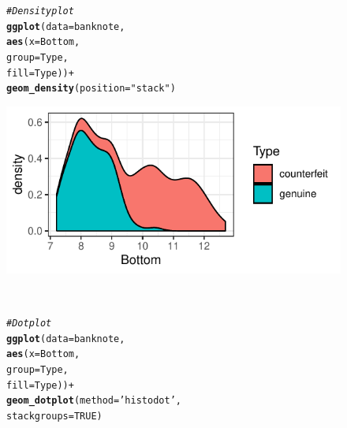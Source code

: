 \documentclass[letterpaper]{ar-1col}\usepackage[]{graphicx}\usepackage[]{color}
\makeatletter
\newcommand{\hlnum}[1]{\textcolor[rgb]{0.686,0.059,0.569}{#1}}%
\newcommand{\hlstr}[1]{\textcolor[rgb]{0.192,0.494,0.8}{#1}}%
\newcommand{\hlcom}[1]{\textcolor[rgb]{0.678,0.584,0.686}{\textit{#1}}}%
\newcommand{\hlopt}[1]{\textcolor[rgb]{0,0,0}{#1}}%
\newcommand{\hlstd}[1]{\textcolor[rgb]{0.345,0.345,0.345}{#1}}%
\newcommand{\hlkwc}[1]{\textcolor[rgb]{0.333,0.667,0.333}{#1}}%
\newcommand{\hlkwd}[1]{\textcolor[rgb]{0.737,0.353,0.396}{\textbf{#1}}}%
\newenvironment{kframe}{%
 \def\at@end@of@kframe{}%
 \ifinner\ifhmode%
  \def\at@end@of@kframe{\end{minipage}}%
  \begin{minipage}{\columnwidth}%
 \fi\fi%
 \def\FrameCommand##1{\hskip\@totalleftmargin \hskip-\fboxsep
 \colorbox{shadecolor}{##1}\hskip-\fboxsep
     \hskip-\linewidth \hskip-\@totalleftmargin \hskip\columnwidth}%
 \MakeFramed {\advance\hsize-\width
   \@totalleftmargin\z@ \linewidth\hsize
   \@setminipage}}%
 {\par\unskip\endMakeFramed%
 \at@end@of@kframe}
\newenvironment{knitrout}{}{} %
\makeatother
\begin{document}
\begin{figure}
\begin{minipage}{.495\textwidth}
\begin{knitrout}
\color{fgcolor}\begin{kframe}
\begin{alltt}
\hlcom{# Density plot}
\hlkwd{ggplot}\hlstd{(}\hlkwc{data} \hlstd{= banknote,}
       \hlkwd{aes}\hlstd{(}\hlkwc{x} \hlstd{= Bottom,}
           \hlkwc{group} \hlstd{= Type,}
           \hlkwc{fill} \hlstd{= Type))} \hlopt{+}
  \hlkwd{geom_density}\hlstd{(}\hlkwc{position} \hlstd{=} \hlstr{"stack"}\hlstd{)}
\end{alltt}
\end{kframe}
\end{knitrout}
\end{minipage}\hfill
\begin{minipage}{.45\textwidth}
\includegraphics[width=.99\textwidth]{figure/gg-plots-figs-1}
\end{minipage}\\
\begin{minipage}{.495\textwidth}
\begin{knitrout}
\color{fgcolor}\begin{kframe}
\begin{alltt}
\hlcom{# Dotplot}
\hlkwd{ggplot}\hlstd{(}\hlkwc{data} \hlstd{= banknote,}
       \hlkwd{aes}\hlstd{(}\hlkwc{x} \hlstd{= Bottom,}
           \hlkwc{group} \hlstd{= Type,}
           \hlkwc{fill} \hlstd{= Type))} \hlopt{+}
  \hlkwd{geom_dotplot}\hlstd{(}\hlkwc{method} \hlstd{=} \hlstr{'histodot'}\hlstd{,}
               \hlkwc{stackgroups} \hlstd{=} \hlnum{TRUE}\hlstd{)}
\end{alltt}
\end{kframe}
\end{knitrout}
\end{minipage}\hfill

\end{figure}
\end{document}
